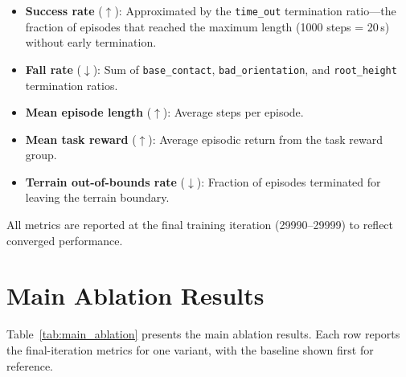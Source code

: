 \begin{itemize}
    \item \textbf{Success rate} ($\uparrow$): Approximated by the \texttt{time\_out} termination ratio---the fraction of episodes that reached the maximum length (1000 steps = 20\,s) without early termination.
    \item \textbf{Fall rate} ($\downarrow$): Sum of \texttt{base\_contact}, \texttt{bad\_orientation}, and \texttt{root\_height} termination ratios.
    \item \textbf{Mean episode length} ($\uparrow$): Average steps per episode.
    \item \textbf{Mean task reward} ($\uparrow$): Average episodic return from the task reward group.
    \item \textbf{Terrain out-of-bounds rate} ($\downarrow$): Fraction of episodes terminated for leaving the terrain boundary.
\end{itemize}

All metrics are reported at the final training iteration (29990--29999) to reflect converged performance.

\section{Main Ablation Results}
\label{sec:main_ablation_table}

Table~\ref{tab:main_ablation} presents the main ablation results. Each row reports the final-iteration metrics for one variant, with the baseline shown first for reference.

